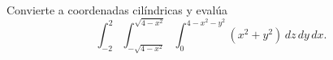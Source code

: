 Convierte a coordenadas cilíndricas y evalúa
\[
\int_{-2}^2\int_{-\sqrt{4-x^2}}^{\sqrt{4-x^2}}
\int_0^{4-x^2-y^2}(x^2+y^2)\,dz\,dy\,dx.
\]
